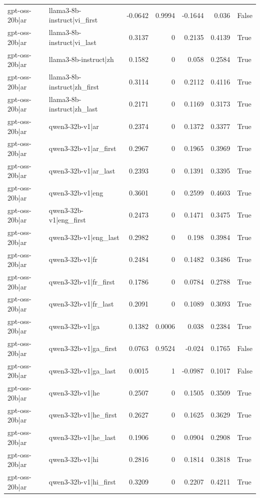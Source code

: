\begin{table}
\begin{tabular}{l l r r r r l}
gpt-oss-20b|ar & llama3-8b-instruct|vi_first & -0.0642 & 0.9994 & -0.1644 & 0.036 & False \\
gpt-oss-20b|ar & llama3-8b-instruct|vi_last & 0.3137 & 0 & 0.2135 & 0.4139 & True \\
gpt-oss-20b|ar & llama3-8b-instruct|zh & 0.1582 & 0 & 0.058 & 0.2584 & True \\
gpt-oss-20b|ar & llama3-8b-instruct|zh_first & 0.3114 & 0 & 0.2112 & 0.4116 & True \\
gpt-oss-20b|ar & llama3-8b-instruct|zh_last & 0.2171 & 0 & 0.1169 & 0.3173 & True \\
gpt-oss-20b|ar & qwen3-32b-v1|ar & 0.2374 & 0 & 0.1372 & 0.3377 & True \\
gpt-oss-20b|ar & qwen3-32b-v1|ar_first & 0.2967 & 0 & 0.1965 & 0.3969 & True \\
gpt-oss-20b|ar & qwen3-32b-v1|ar_last & 0.2393 & 0 & 0.1391 & 0.3395 & True \\
gpt-oss-20b|ar & qwen3-32b-v1|eng & 0.3601 & 0 & 0.2599 & 0.4603 & True \\
gpt-oss-20b|ar & qwen3-32b-v1|eng_first & 0.2473 & 0 & 0.1471 & 0.3475 & True \\
gpt-oss-20b|ar & qwen3-32b-v1|eng_last & 0.2982 & 0 & 0.198 & 0.3984 & True \\
gpt-oss-20b|ar & qwen3-32b-v1|fr & 0.2484 & 0 & 0.1482 & 0.3486 & True \\
gpt-oss-20b|ar & qwen3-32b-v1|fr_first & 0.1786 & 0 & 0.0784 & 0.2788 & True \\
gpt-oss-20b|ar & qwen3-32b-v1|fr_last & 0.2091 & 0 & 0.1089 & 0.3093 & True \\
gpt-oss-20b|ar & qwen3-32b-v1|ga & 0.1382 & 0.0006 & 0.038 & 0.2384 & True \\
gpt-oss-20b|ar & qwen3-32b-v1|ga_first & 0.0763 & 0.9524 & -0.024 & 0.1765 & False \\
gpt-oss-20b|ar & qwen3-32b-v1|ga_last & 0.0015 & 1 & -0.0987 & 0.1017 & False \\
gpt-oss-20b|ar & qwen3-32b-v1|he & 0.2507 & 0 & 0.1505 & 0.3509 & True \\
gpt-oss-20b|ar & qwen3-32b-v1|he_first & 0.2627 & 0 & 0.1625 & 0.3629 & True \\
gpt-oss-20b|ar & qwen3-32b-v1|he_last & 0.1906 & 0 & 0.0904 & 0.2908 & True \\
gpt-oss-20b|ar & qwen3-32b-v1|hi & 0.2816 & 0 & 0.1814 & 0.3818 & True \\
gpt-oss-20b|ar & qwen3-32b-v1|hi_first & 0.3209 & 0 & 0.2207 & 0.4211 & True \\

\end{tabular}
\end{table}

